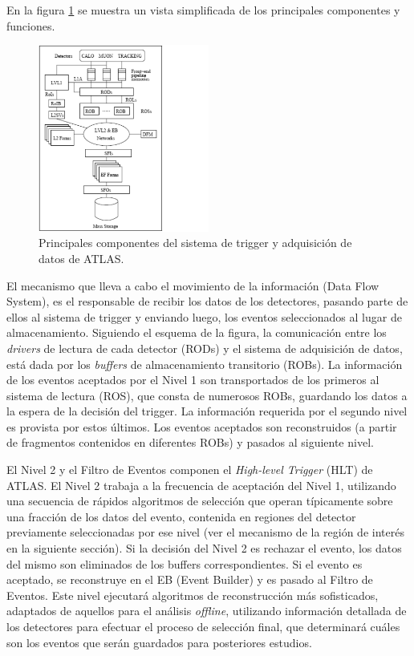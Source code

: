    En la figura \ref{fig:TDAQ} se muestra un vista simplificada de los principales componentes y funciones.  

\begin{figure}[!h]
\begin{center}
\includegraphics[width=0.5\textwidth]{Fig3/paint_TDAQ.pdf}
\caption{Principales componentes del sistema de trigger y adquisici\'on de datos de ATLAS. } 
\label{fig:TDAQ}
\end{center}
\end{figure}

   El mecanismo que lleva a cabo el movimiento de la informaci\'on (Data Flow System), es el responsable de recibir los datos de los detectores, pasando parte de ellos al sistema de trigger y enviando luego, los eventos seleccionados al lugar de almacenamiento. Siguiendo el esquema de la figura, la comunicaci\'on entre los \emph{drivers} de lectura %
de cada detector (RODs) y el sistema de adquisici\'on de datos, est\'a dada por los \emph{buffers} de almacenamiento transitorio (ROBs). La informaci\'on de los eventos aceptados por el Nivel 1 son transportados de los primeros al sistema de lectura (ROS), que consta de numerosos ROBs, guardando los datos a la espera de la decisi\'on del trigger. La informaci\'on requerida por el segundo nivel es provista por estos \'ultimos. Los eventos aceptados son reconstruidos (a partir de fragmentos contenidos en diferentes ROBs) y pasados al siguiente nivel.

   El Nivel 2 y el Filtro de Eventos componen el \emph{High-level Trigger} (HLT) de ATLAS. El Nivel 2 trabaja a la frecuencia de aceptaci\'on del Nivel 1, utilizando una secuencia de r\'apidos algoritmos de selecci\'on que operan t\'ipicamente sobre una fracci\'on de los datos del evento, contenida en regiones del detector previamente seleccionadas por ese nivel (ver el mecanismo de la regi\'on de inter\'es en la siguiente secci\'on). Si la decisi\'on del Nivel 2 es rechazar el evento, los datos del mismo son eliminados de los buffers correspondientes. Si el evento es aceptado,  se reconstruye  en el EB (Event Builder) y es pasado al Filtro de Eventos. Este nivel ejecutar\'a algoritmos de reconstrucci\'on m\'as sofisticados, adaptados de aquellos para el an\'alisis \emph{offline}, utilizando informaci\'on detallada de los detectores para efectuar el proceso de selecci\'on final, que determinar\'a cu\'ales son los eventos que ser\'an guardados para posteriores estudios.

